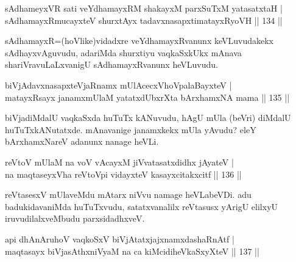 
\begin{shl}
sAdhameyxVR sati veYdhamayxRM shakayxM parxSuTxM yatasatxtaH |\\
sAdhamayxRmucayxteV shurxtAyx tadavxnasapxtimatayxRyoVH \hfill || 134 ||
\end{shl}

\begin{artha}
sAdhamayxR=(hoVlike)vidadxre veYdhamayxRvanunx keVLuvudakekx sAdhayxvAguvudu, adariMda shurxtiyu vaqkaSxkUkx mAnava shariVravuLaLxvanigU sAdhamayxRvanunx heVLuvudu.
\end{artha}


\begin{shl}
biVjAdavxnasapxteVjaRnamx mUlAcecxVhoVpalaBayxteV |\\
matayxRsayx janamxmUlaM yatatxdUbxrXta bArxhamxNA mama \hfill || 135 ||
\end{shl}

\begin{artha}
biVjadiMdalU vaqkaSxda huTuTx kANuvudu, hAgU mUla (beVri) diMdalU huTuTxkANutatxde. mAnavanige janamxkekx mUla yAvudu? eleY bArxhamxNareV adanunx nanage heVLi.
\end{artha}

\begin{shl}
reVtoV mUlaM na voV vAcayxM jiVvatasatxdidhx jAyateV |\\
na maqtaseyxVha reVtoV\s pi vidayxteV kasayxcitakxcitf \hfill || 136 ||
\end{shl}

\begin{artha}
reVtasesxV mUlaveMdu mAtarx niVvu namage heVLabeVDi. adu badukidavaniMda huTuTxvudu, satatxvanalilx reVtasusx yArigU elilxyU iruvudilalxveMbudu parxsidadhxveV.
\end{artha}

\begin{shl}
\footnotemark[1]{}api dhAnAruhoV vaqkoSxV biVjAtatxjajxnamxdashaRnAtf |\\
maqtasayx biVjasAthxniVyaM na ca kiMcidiheVkaSxyXteV \hfill || 137 ||
\end{shl}

